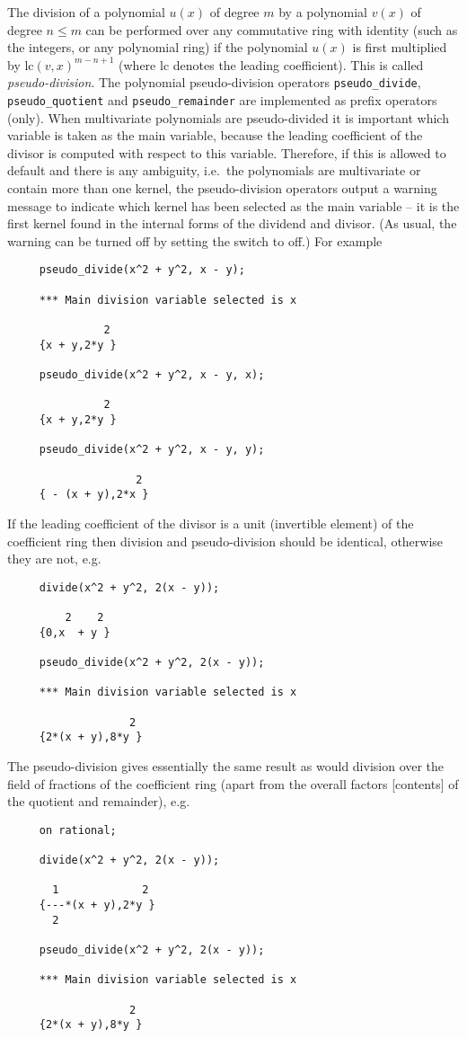 The division of a polynomial $u(x)$ of degree $m$ by a polynomial
$v(x)$ of degree $n \le m$ can be performed over any commutative ring
with identity (such as the integers, or any polynomial ring) if the
polynomial $u(x)$ is first multiplied by $\mathrm{lc}(v,x)^{m-n+1}$
(where lc denotes the leading coefficient).  This is called
\emph{pseudo-division}.  The polynomial pseudo-division operators
\texttt{pseudo\_divide}, \texttt{pseudo\_quotient} and
\texttt{pseudo\_remainder} are implemented as prefix operators (only).
When multivariate polynomials are pseudo-divided it is important which
variable is taken as the main variable, because the leading
coefficient of the divisor is computed with respect to this variable.
Therefore, if this is allowed to default and there is any ambiguity,
i.e.\ the polynomials are multivariate or contain more than one
kernel, the pseudo-division operators output a warning message to
indicate which kernel has been selected as the main variable -- it is
the first kernel found in the internal forms of the dividend and
divisor.  (As usual, the warning can be turned off by setting the
switch  to off.)  For example
\begin{verbatim}
     pseudo_divide(x^2 + y^2, x - y);

     *** Main division variable selected is x

               2
     {x + y,2*y }

     pseudo_divide(x^2 + y^2, x - y, x);

               2
     {x + y,2*y }

     pseudo_divide(x^2 + y^2, x - y, y);

                    2
     { - (x + y),2*x }
\end{verbatim}

If the leading coefficient of the divisor is a unit (invertible
element) of the coefficient ring then division and pseudo-division
should be identical, otherwise they are not, e.g.
\begin{verbatim}
     divide(x^2 + y^2, 2(x - y));

         2    2
     {0,x  + y }

     pseudo_divide(x^2 + y^2, 2(x - y));

     *** Main division variable selected is x

                   2
     {2*(x + y),8*y }
\end{verbatim}

The pseudo-division gives essentially the same result as would
division over the field of fractions of the coefficient ring (apart
from the overall factors [contents] of the quotient and remainder),
e.g.
\begin{verbatim}
     on rational;

     divide(x^2 + y^2, 2(x - y));

       1             2
     {---*(x + y),2*y }
       2

     pseudo_divide(x^2 + y^2, 2(x - y));

     *** Main division variable selected is x

                   2
     {2*(x + y),8*y }
\end{verbatim}

